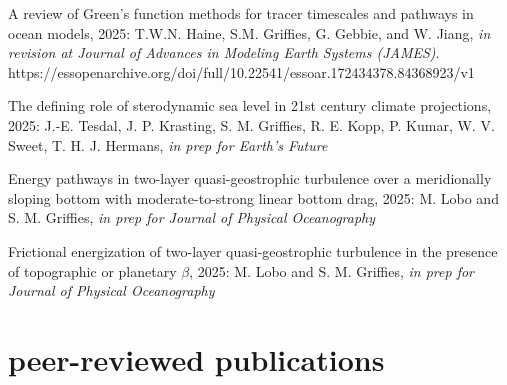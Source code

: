 \begin{etaremune}
\item A review of Green's function methods for tracer timescales and pathways in ocean models, 2025: T.W.N. Haine, S.M. Grif\/f\/ies, G. Gebbie, and W. Jiang, {\it in revision at Journal of Advances in Modeling Earth Systems (JAMES)}. https://essopenarchive.org/doi/full/10.22541/essoar.172434378.84368923/v1

\item The defining role of sterodynamic sea level in 21st century climate projections, 2025: J.-E. Tesdal, J. P. Krasting, S. M. Griffies, R. E. Kopp, P.  Kumar,  W. V. Sweet, T. H. J. Hermans, {\it in prep for Earth's Future}

\item Energy pathways in two-layer quasi-geostrophic turbulence over a
meridionally sloping bottom with moderate-to-strong linear bottom drag, 2025: M. Lobo and S. M. Griffies, {\it in prep for Journal of Physical Oceanography}

\item Frictional energization of two-layer quasi-geostrophic turbulence in the presence of topographic or planetary $\beta$, 2025: M. Lobo and S. M. Griffies, {\it in prep for Journal of Physical Oceanography}


\end{etaremune}


\section*{\sc \color{Maroon} peer-reviewed publications}

\small 

